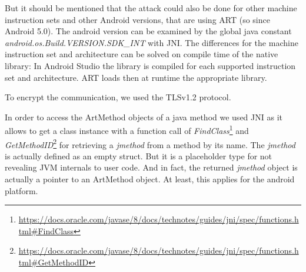 But it should be mentioned that the attack could also be done for other machine instruction sets and other Android versions, that are using ART (so since Android 5.0). The android version can be examined by the global java constant \emph{android.os.Build.VERSION.SDK\_INT} with JNI.
The differences for the machine instruction set and architecture can be solved on compile time of the native library: In Android Studio the library is compiled for each supported instruction set and architecture. ART loads then at runtime the appropriate library.

To encrypt the communication, we used the TLSv1.2 protocol. 

In order to access the ArtMethod objects of a java method we used JNI as it allows to get a class instance with a function call of  \emph{FindClass}\footnote{\url{https://docs.oracle.com/javase/8/docs/technotes/guides/jni/spec/functions.html\#FindClass}} and \emph{GetMethodID}\footnote{\url{https://docs.oracle.com/javase/8/docs/technotes/guides/jni/spec/functions.html\#GetMethodID}} for retrieving a \emph{jmethod} from a method by its name. The \emph{jmethod} is actually defined as an empty struct. But it is a placeholder type for not revealing JVM internals to user code. And in fact, the returned \emph{jmethod} object is actually a pointer to an ArtMethod object. At least, this applies for the android platform.




